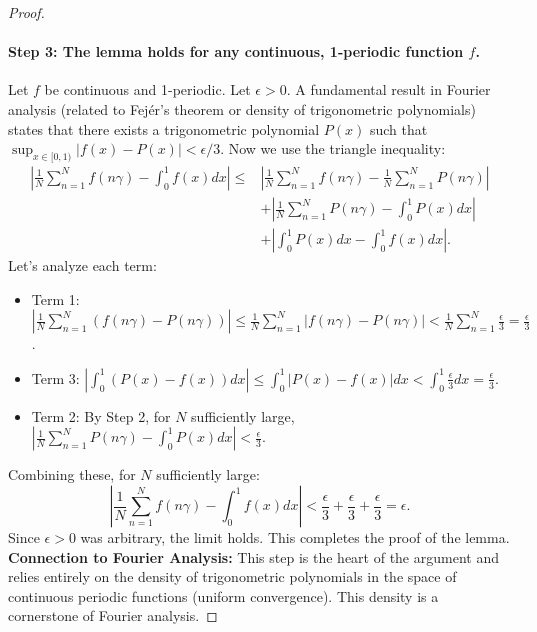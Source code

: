 \documentclass[12pt]{article}
\begin{document}
\begin{proof}
\paragraph{Step 3: The lemma holds for any continuous, 1-periodic function $f$.}
Let $f$ be continuous and 1-periodic. Let $\epsilon > 0$.
A fundamental result in Fourier analysis (related to Fejér's theorem or density of trigonometric polynomials) states that there exists a trigonometric polynomial $P(x)$ such that $\sup_{x \in [0,1)} |f(x) - P(x)| < \epsilon/3$.
Now we use the triangle inequality:
\begin{align*}
\left| \frac{1}{N} \sum_{n=1}^N f(n\gamma) - \int_0^1 f(x) dx \right| \le & \left| \frac{1}{N} \sum_{n=1}^N f(n\gamma) - \frac{1}{N} \sum_{n=1}^N P(n\gamma) \right| \\
& + \left| \frac{1}{N} \sum_{n=1}^N P(n\gamma) - \int_0^1 P(x) dx \right| \\
& + \left| \int_0^1 P(x) dx - \int_0^1 f(x) dx \right|.
\end{align*}
Let's analyze each term:
\begin{itemize}
    \item Term 1: $\left| \frac{1}{N} \sum_{n=1}^N (f(n\gamma) - P(n\gamma)) \right| \le \frac{1}{N} \sum_{n=1}^N |f(n\gamma) - P(n\gamma)| < \frac{1}{N} \sum_{n=1}^N \frac{\epsilon}{3} = \frac{\epsilon}{3}$.
    \item Term 3: $\left| \int_0^1 (P(x) - f(x)) dx \right| \le \int_0^1 |P(x) - f(x)| dx < \int_0^1 \frac{\epsilon}{3} dx = \frac{\epsilon}{3}$.
    \item Term 2: By Step 2, for $N$ sufficiently large, $\left| \frac{1}{N} \sum_{n=1}^N P(n\gamma) - \int_0^1 P(x) dx \right| < \frac{\epsilon}{3}$.
\end{itemize}

Combining these, for $N$ sufficiently large:
$$ \left| \frac{1}{N} \sum_{n=1}^N f(n\gamma) - \int_0^1 f(x) dx \right| < \frac{\epsilon}{3} + \frac{\epsilon}{3} + \frac{\epsilon}{3} = \epsilon. $$
Since $\epsilon > 0$ was arbitrary, the limit holds. This completes the proof of the lemma.
\textbf{Connection to Fourier Analysis:} This step is the heart of the argument and relies entirely on the density of trigonometric polynomials in the space of continuous periodic functions (uniform convergence). This density is a cornerstone of Fourier analysis.
\end{proof}
\end{document}
